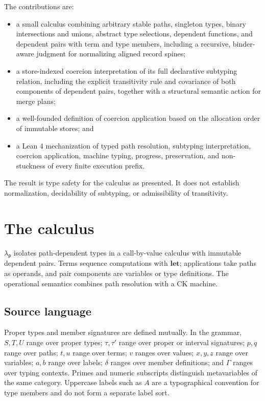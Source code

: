 \documentclass[acmsmall,screen,nonacm]{acmart}
\newcommand{\lambdap}{\ensuremath{\lambda_{\mathsf p}}}
\begin{document}
The contributions are:
\begin{itemize}
\item a small calculus combining arbitrary stable paths, singleton types,
  binary intersections and unions, abstract type selections, dependent
  functions, and dependent pairs with term and type members, including a
  recursive, binder-aware judgment for normalizing aligned record spines;
\item a store-indexed coercion interpretation of its full declarative
  subtyping relation, including the explicit transitivity rule and covariance
  of both components of dependent pairs, together with a structural semantic
  action for merge plans;
\item a well-founded definition of coercion application based on the allocation order
  of immutable stores; and
\item a Lean 4 mechanization of typed path resolution, subtyping
  interpretation, coercion application, machine typing, progress,
  preservation, and
  non-stuckness of every finite execution prefix.
\end{itemize}

The result is type safety for the calculus as presented. It does not establish
normalization, decidability of subtyping, or admissibility of transitivity.

\section{The calculus}
\label{sec:calculus}

\lambdap{} isolates path-dependent types in a call-by-value calculus with
immutable dependent pairs. Terms sequence computations with
\(\mathbf{let}\); applications take paths as operands, and pair components
are variables or type definitions. The operational semantics combines path
resolution with a CK machine.

\subsection{Source language}
\label{sec:syntax}

Proper types and member signatures are defined mutually. In the grammar,
\(S,T,U\) range over proper types; \(\tau,\tau'\) range over proper
or interval signatures; \(p,q\) range over paths; \(t,u\) range over
terms; \(v\) ranges over values; \(x,y,z\) range over variables; \(a,b\)
range over labels; \(\delta\) ranges over member definitions; and \(\Gamma\)
ranges over typing contexts. Primes and numeric subscripts distinguish
metavariables of the same category. Uppercase labels such as \(A\) are a
typographical convention for type members and do not form a separate label
sort.
\end{document}
